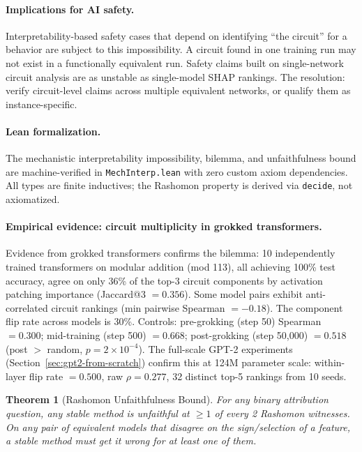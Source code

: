 \documentclass{article}
\newtheorem{theorem}{Theorem}
\begin{document}
\paragraph{Implications for AI safety.}
Interpretability-based safety cases that depend on identifying ``the circuit'' for a behavior are subject to this impossibility. A circuit found in one training run may not exist in a functionally equivalent run. Safety claims built on single-network circuit analysis are as unstable as single-model SHAP rankings. The resolution: verify circuit-level claims across multiple equivalent networks, or qualify them as instance-specific.

\paragraph{Lean formalization.}
The mechanistic interpretability impossibility, bilemma, and unfaithfulness bound are machine-verified in \texttt{MechInterp.lean} with zero custom axiom dependencies. All types are finite inductives; the Rashomon property is derived via \texttt{decide}, not axiomatized.

\paragraph{Empirical evidence: circuit multiplicity in grokked transformers.}
Evidence from grokked transformers confirms the bilemma: 10 independently trained transformers on modular addition (mod 113), all achieving 100\% test accuracy, agree on only 36\% of the top-3 circuit components by activation patching importance (Jaccard@3 $= 0.356$). Some model pairs exhibit anti-correlated circuit rankings (min pairwise Spearman $= -0.18$). The component flip rate across models is 30\%. Controls: pre-grokking (step 50) Spearman $= 0.300$; mid-training (step 500) $= 0.668$; post-grokking (step 50{,}000) $= 0.518$ (post $>$ random, $p = 2 \times 10^{-4}$). The full-scale GPT-2 experiments (Section~\ref{sec:gpt2-from-scratch}) confirm this at 124M parameter scale: within-layer flip rate $= 0.500$, raw $\rho = 0.277$, 32 distinct top-5 rankings from 10 seeds.

\begin{theorem}[Rashomon Unfaithfulness Bound]\label{thm:unfaith-bound}
For any binary attribution question, any stable method is unfaithful at $\geq 1$ of every 2 Rashomon witnesses.
On any pair of equivalent models that disagree on the sign/selection of a feature, a stable method must get it wrong for at least one of them.
\end{theorem}
\end{document}
